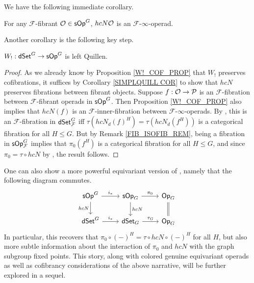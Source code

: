 \documentclass[a4paper,10pt
,draft
]{article}%
\renewcommand{\F}{\mathcal F}
\renewcommand{\1}{\eta}%
\begin{document}
We have the following immediate corollary.
\begin{corollary}
      For any $\F$-fibrant $\mathcal{O} \in \mathsf{sOp}^G$, $h c N \mathcal{O}$ is an $\F$-$\infty$-operad.
\end{corollary}

Another corollary is the following key step.

\begin{proposition}[{cf. \cite[Prop/ 4.9]{CM11}}]
      $W_!: \mathsf{dSet}^G \to \mathsf{sOp}^G$ is left Quillen.
\end{proposition}
\begin{proof}
      As we already know by Proposition \ref{W!_COF_PROP} that $W_!$ preserves cofibrations,
      it suffices by Corollary \ref{SIMPLQUILL COR} to show that $h c N$ preserves fibrations between fibrant objects.
      Suppose $f: \mathcal{O} \to \mathcal{P}$ is an $\F$-fibration between $\F$-fibrant operads in $\mathsf{sOp}^G$.
      Then Proposition \ref{W!_COF_PROP} also implies that $h c N (f)$ is an $\F$-inner-fibration between $\F$-$\infty$-operads.
      By \cite[Thm. 8.22]{Per_eds}, this is an $\F$-fibration in $\dSet^G_\F$ iff $\tau (h c N_d(f)^H) = \tau (h c N_d(f^H))$ is a categorical fibration for all $H \leq G$.
      But by Remark \ref{FIB_ISOFIB_REM}, being a fibration in $\sOp^G_\F$ implies that $\pi_0(f^H)$ is a categorical fibration for all $H \leq G$, 
      and since $\pi_0 = \tau \circ h c N$ by \cite[Prop. 4.8]{CM11}, the result follows.
\end{proof}

\begin{remark}
      One can also show a more powerful equivariant version of \cite[Prop. 4.8]{CM11},
      namely that the following diagram commutes.
      \begin{equation}
            \begin{tikzcd}
                  \sOp^G \arrow[r, "i_{\**}"] \arrow[d, "h c N"']
                  &
                  \sOp_G \arrow[d, "h c N"] \arrow[r, "\pi_0"]
                  &
                  \Op_G \arrow[d, equal]
                  \\
                  \dSet^G \arrow[r, "i_{\**}"]
                  &
                  \dSet_G \arrow[r, "\tau_G"]
                  &
                  \Op_G
            \end{tikzcd}
      \end{equation}
      In particular, this recovers that $\pi_0 \circ (-)^H = \tau \circ h c N \circ (-)^H$ for all $H$,
      but also more subtle information about the interaction of $\pi_0$ and $h c N$ with the graph subgroup fixed points.
      This story, along with colored genuine equivariant operads as well as cofibrancy considerations of the above narrative,
      will be further explored in a sequel. 
\end{remark}
\end{document}

